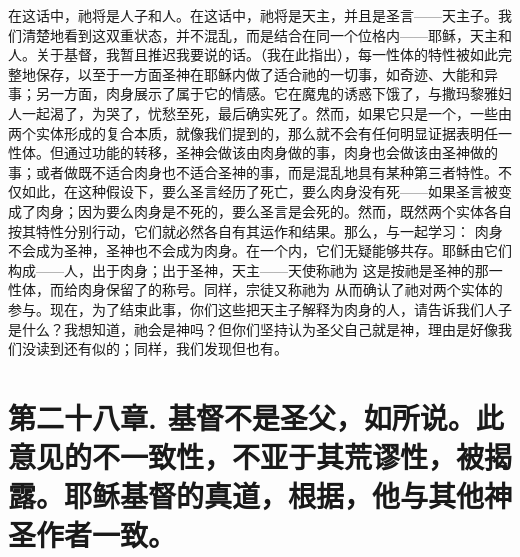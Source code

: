 在这话中，祂将是人子和人。在这话中，祂将是天主，并且是圣言——天主子。我们清楚地看到这双重状态，并不混乱，而是结合在同一个位格内——耶稣，天主和人。关于基督，我暂且推迟我要说的话。（我在此指出），每一性体的特性被如此完整地保存，以至于一方面圣神在耶稣内做了适合祂的一切事，如奇迹、大能和异事；另一方面，肉身展示了属于它的情感。它在魔鬼的诱惑下饿了，与撒玛黎雅妇人一起渴了，为哭了，忧愁至死，最后确实死了。然而，如果它只是一个，一些由两个实体形成的复合本质，就像我们提到的，那么就不会有任何明显证据表明任一性体。但通过功能的转移，圣神会做该由肉身做的事，肉身也会做该由圣神做的事；或者做既不适合肉身也不适合圣神的事，而是混乱地具有某种第三者特性。不仅如此，在这种假设下，要么圣言经历了死亡，要么肉身没有死——如果圣言被变成了肉身；因为要么肉身是不死的，要么圣言是会死的。然而，既然两个实体各自按其特性分别行动，它们就必然各自有其运作和结果。那么，与一起学习： 肉身不会成为圣神，圣神也不会成为肉身。在一个内，它们无疑能够共存。耶稣由它们构成——人，出于肉身；出于圣神，天主——天使称祂为 这是按祂是圣神的那一性体，而给肉身保留了的称号。同样，宗徒又称祂为 从而确认了祂对两个实体的参与。现在，为了结束此事，你们这些把天主子解释为肉身的人，请告诉我们人子是什么？我想知道，祂会是神吗？但你们坚持认为圣父自己就是神，理由是好像我们没读到还有似的；同样，我们发现但也有。\par


\section{第二十八章. 基督不是圣父，如所说。此意见的不一致性，不亚于其荒谬性，被揭露。耶稣基督的真道，根据，他与其他神圣作者一致。}

